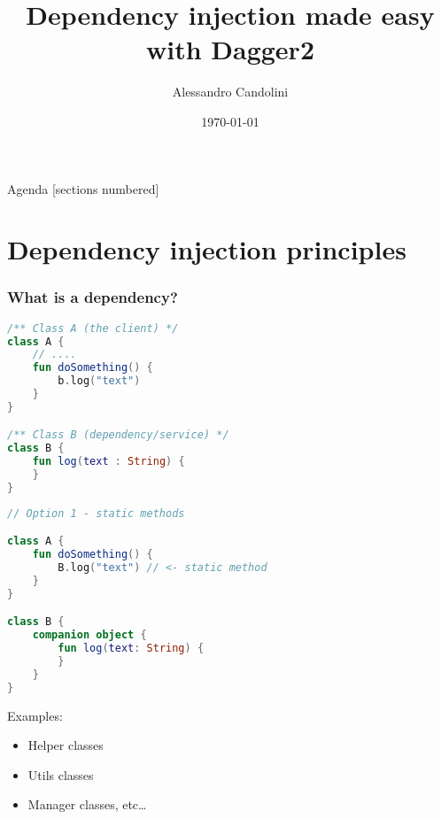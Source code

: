 \documentclass[10pt]{beamer}
\title{Dependency injection made easy with Dagger2}
\date{\today}
\author[A. Candolini]{Alessandro Candolini}
\begin{document}
\maketitle

\begin{frame}{Agenda}
  [sections numbered]
  \tableofcontents[hideallsubsections]
\end{frame}

\section{Dependency injection principles}
\begin{frame}[fragile]
	\frametitle{What is a dependency?}
		\begin{figure}
			\centering
{}
		\end{figure}
\end{frame}
\begin{frame}[fragile]
\begin{lstlisting}[language=Kotlin, basicstyle=\ttfamily]
/** Class A (the client) */
class A {
    // ....
    fun doSomething() {
        b.log("text")
    }
}

/** Class B (dependency/service) */
class B {
    fun log(text : String) {
    }
}
\end{lstlisting} 
\end{frame}
	\begin{frame}[fragile]
\begin{lstlisting}[language=Kotlin, basicstyle=\ttfamily]
// Option 1 - static methods 

class A {
    fun doSomething() {
        B.log("text") // <- static method
    }
}

class B {
    companion object {
        fun log(text: String) {
        }
    }
}
\end{lstlisting} 
	\end{frame}

	\begin{frame}
		Examples:
		\begin{itemize}
			\item Helper  classes
			\item Utils  classes
			\item Manager classes, etc\ldots
		\end{itemize}
	\end{frame}
\end{document}
